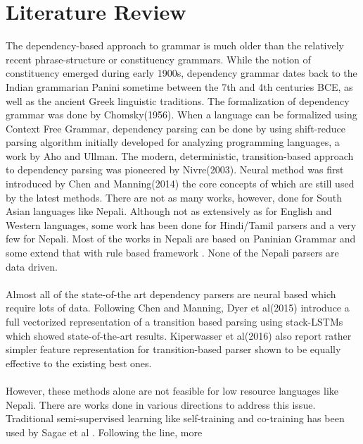 \section {Literature Review}
The dependency-based approach to grammar is much older than the relatively
recent phrase-structure or constituency grammars. While the notion of
constituency emerged during early 1900s, dependency grammar dates back to the
Indian grammarian Panini sometime between the 7th and 4th centuries BCE, as
well as the ancient Greek linguistic traditions\cite{stanfordLec}. The
formalization of dependency grammar was done by Chomsky(1956)\cite{chomsky}.
When a language can be formalized using Context Free Grammar, dependency
parsing can be done by using shift-reduce parsing algorithm initially developed
for analyzing programming languages, a work by Aho and Ullman\cite{ullman}. The
modern, deterministic, transition-based approach to dependency parsing was
pioneered by Nivre(2003)\cite{nivre1}. Neural method was first introduced by
Chen and Manning(2014)\cite{chen} the core concepts of which are still used by
the latest methods.
\newline
\newline
There are not as many works, however, done for South Asian languages like
Nepali. Although not as extensively as for English and Western languages, some
work has been done for Hindi/Tamil parsers \cite{tamilDep} and a very few for
Nepali.  Most of the works in Nepali are based on Paninian Grammar
\cite{paninianEng,yajnik1,yajnik2} and some extend that with rule based
framework \cite{balCompGrammar}. None of the Nepali parsers are data driven.
\\~\\
Almost all of the state-of-the art dependency parsers are neural based which
require lots of data. Following Chen and Manning\cite{chen}, Dyer et
al(2015)\cite{stackLstm} introduce a full vectorized representation of a
transition based parsing using stack-LSTMs which showed state-of-the-art
results.  Kiperwasser et al(2016)\cite{bistParser} also report rather simpler
feature representation for transition-based parser shown to be equally
effective to the existing best ones.
\\~\\
However, these methods alone are not feasible for low resource languages like
Nepali. There are works done in various directions to address this issue.
Traditional semi-supervised learning like self-training and co-training has
been used by Sagae et al \cite{semiSupervised1}. Following the line, more
